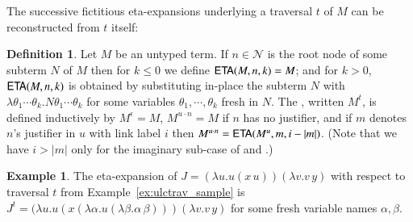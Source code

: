 \documentclass{elsarticle}
\newif\iflongversion
\theoremstyle{plain}
\theoremstyle{definition}
\newtheorem{definition}{Definition}[section]
\newtheorem{example}{Example}[section]
\newcommand\Nodes{\mathcal{N}}%
\newcommand{\ctree}{\Tau} %
\begin{document}
The successive fictitious eta-expansions underlying a traversal $t$ of $M$ can be reconstructed from $t$ itself:
\begin{definition}
\label{def:onthefly_etaexpansion}
Let $M$ be an untyped term. If $n\in \Nodes$ is the root node of some subterm $N$ of $M$ then
for $k \leq 0$ we define ${\sf ETA}(M, n, k) = M$; and for $k> 0$,
 ${\sf ETA}(M, n, k)$ is obtained by substituting in-place the subterm $N$ with $\lambda\theta_1 \cdots \theta_k. N \theta_1 \cdots \theta_k$ for some variables $\theta_1, \cdots, \theta_k$ fresh in $N$.
%
The , written $M^t$, is defined inductively by $M^\epsilon = M$,
$M^{u \cdot n} = M$ if $n$ has no justifier, and if $m$ denotes $n$'s justifier in $u$ with link label $i$ then $M^{u \cdot n} = {\sf ETA}(M^{u}, m, i-|m|)$.
%
(Note that we have $i>|m|$ only for the imaginary sub-case of  and .)
\end{definition}

\iflongversion
It follows that $M$ is a sub-tree of $M^t$: paths in $\ctree(M)$ are also paths in $\ctree(M^t)$.
\fi

\begin{example}
The eta-expansion of $J = (\lambda u . u(x\,u)) (\lambda v . v\,y)$ with respect to traversal $t$ from Example~\ref{ex:ulctrav_sample} is
$J^t = (\lambda u . u(x (\lambda \alpha. u (\lambda \beta.\alpha\,\beta))) (\lambda v . v\,y)$
for some fresh variable names $\alpha, \beta$.
\end{example}
\end{document}
